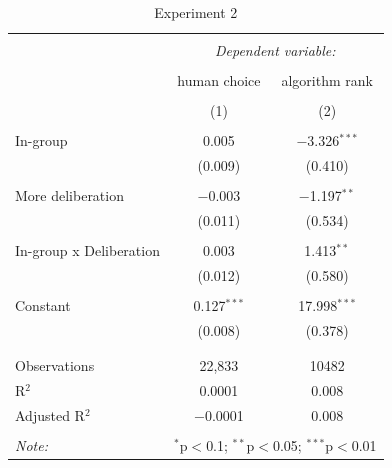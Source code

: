 \documentclass[12pt,letterpaper]{article}
\begin{document}
\begin{table}[!htbp] \centering 
  \caption{Experiment 2} 
  \label{} 
\begin{tabular}{@{\extracolsep{5pt}}lcc} 
\\[-1.8ex]\hline 
\hline \\[-1.8ex] 
 & \multicolumn{2}{c}{\textit{Dependent variable:}} \\ 
\cline{2-3} 
\\[-1.8ex] & human choice & algorithm rank \\ 
\\[-1.8ex] & (1) & (2)\\ 
\hline \\[-1.8ex] 
 In-group & 0.005 & $-$3.326$^{***}$ \\ 
  & (0.009) & (0.410) \\ 
  & & \\ 
 More deliberation & $-$0.003 & $-$1.197$^{**}$ \\ 
  & (0.011) & (0.534) \\ 
  & & \\ 
 In-group x Deliberation & 0.003 & 1.413$^{**}$ \\ 
  & (0.012) & (0.580) \\ 
  & & \\ 
 Constant & 0.127$^{***}$ & 17.998$^{***}$ \\ 
  & (0.008) & (0.378) \\ 
  & & \\ 
\hline \\[-1.8ex] 
Observations & 22,833 & 10482 \\ 
R$^{2}$ & 0.0001 & 0.008 \\ 
Adjusted R$^{2}$ & $-$0.0001 & 0.008 \\ 
\hline 
\hline \\[-1.8ex] 
\textit{Note:}  & \multicolumn{2}{r}{$^{*}$p$<$0.1; $^{**}$p$<$0.05; $^{***}$p$<$0.01} \\ 
\end{tabular} 
\end{table} 
\end{document}
